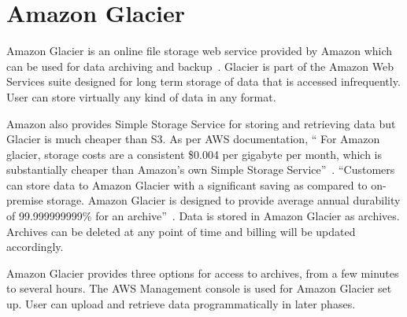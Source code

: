 \section{Amazon Glacier}

Amazon Glacier is an online file storage web service provided by Amazon which
can be used for data archiving and backup~\cite{hid-sp18-420-Amazon-Glacier}.
Glacier is part of the Amazon Web Services suite designed for long term storage
of data that is accessed infrequently. User can store virtually any kind of data
in any format.

Amazon also provides Simple Storage Service for storing and retrieving data but
Glacier is much cheaper than S3. As per AWS documentation, `` For Amazon glacier,
storage costs are a consistent \$0.004 per gigabyte per month, which is
substantially cheaper than Amazon's own Simple Storage
Service''~\cite{hid-sp18-420-Amazon-Glacier-FAQ}. ``Customers can store data to
Amazon Glacier with a significant saving as compared to on-premise storage.
Amazon Glacier is designed to provide average annual durability of
99.999999999\% for an archive''~\cite{hid-sp18-420-Amazon-Glacier}. Data is
stored in Amazon Glacier as archives. Archives can be deleted at any point of
time and billing will be updated accordingly.

Amazon Glacier provides three options for access to archives, from a few minutes
to several hours. The AWS Management console is used for Amazon Glacier set up.
User can upload and retrieve data programmatically in later phases.

